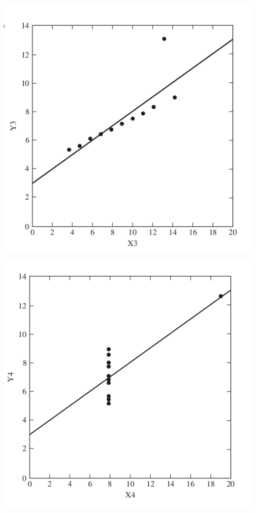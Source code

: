 \documentclass{beamer}
\begin{document}
\begin{frame}
  \begin{center}
    \includegraphics[height=0.7\textheight]{eda-dispersao3}
  \end{center}
\end{frame}

\begin{frame}
  \begin{center}
    \includegraphics[height=0.7\textheight]{eda-dispersao4}
  \end{center}
\end{frame}
\end{document}
